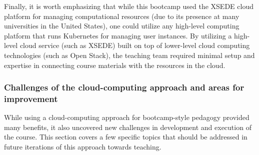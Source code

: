 Finally, it is worth emphasizing that while this bootcamp used
the XSEDE cloud platform for managing computational resources (due to its
presence at many universities in the United States),
one could utilize any high-level computing platform that runs Kubernetes for managing
user instances. By utilizing a high-level cloud service (such as XSEDE) built on
top of lower-level cloud computing technologies (such as Open Stack), the
teaching team required
minimal setup and expertise in connecting course materials with the resources in the cloud.

\subsubsection{Challenges of the cloud-computing approach and areas for improvement}

While using a cloud-computing approach for bootcamp-style pedagogy provided many
benefits, it also uncovered new challenges in development and execution of the
course. This section covers a few specific topics that should be addressed in
future iterations of this approach towards teaching.

